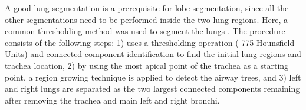 \documentclass[]{spie}  %
\begin{document}
A good lung segmentation is a prerequisite for lobe segmentation, since all the other segmentations need to be performed inside the two lung regions. Here, a common thresholding method was used to segment the lungs \cite{ukil2005smoothing}. The procedure consists of the following steps: 1) uses a thresholding operation (-775 Hounsfield Units) and connected component identification to find the initial lung regions and trachea location, 2) by using the most apical point of the trachea as a starting point, a region growing technique is applied to detect the airway trees, and 3) left and right lungs are separated as the two largest connected components remaining after removing the trachea and main left and right bronchi. 
%
\end{document}
